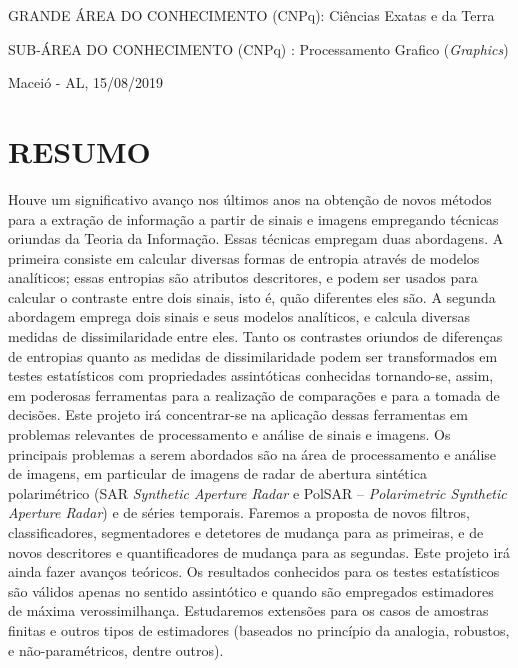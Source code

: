 \documentclass[12pt,letterpaper]{article}
\begin{document}
GRANDE ÁREA DO CONHECIMENTO (CNPq): Ciências  Exatas  e  da  Terra

SUB-ÁREA DO CONHECIMENTO (CNPq) : Processamento Grafico (\textit{Graphics})  

\vspace*{0.8cm}

\begin{center}

Maceió - AL, 15/08/2019

\end{center}

  
  \newpage
\section*{\centering \textbf{RESUMO}} %

Houve um significativo avanço nos últimos anos na obtenção de novos métodos para a extração de informação a partir de sinais e imagens empregando técnicas oriundas da Teoria da Informação. Essas técnicas empregam duas abordagens. A primeira consiste em calcular diversas formas de entropia através de modelos analíticos; essas entropias são atributos descritores, e podem ser usados para calcular o contraste entre dois sinais, isto é, quão diferentes eles são. A segunda abordagem emprega dois sinais e seus modelos analíticos, e calcula diversas medidas de dissimilaridade entre eles. Tanto os contrastes oriundos de diferenças de entropias quanto as medidas de dissimilaridade podem ser transformados em testes estatísticos com propriedades assintóticas conhecidas tornando-se, assim, em poderosas ferramentas para a realização de comparações e para a tomada de decisões. Este projeto irá concentrar-se na aplicação dessas ferramentas em problemas relevantes de processamento e análise de sinais e imagens. Os principais problemas a serem abordados são na área de processamento e análise de imagens, em particular de imagens de radar de abertura sintética polarimétrico (SAR \textit{Synthetic Aperture Radar} e PolSAR -- \textit{Polarimetric Synthetic Aperture Radar}) e de séries temporais. Faremos a proposta de novos filtros, classificadores, segmentadores e detetores de mudança para as primeiras, e de novos descritores e quantificadores de mudança para as segundas. Este projeto irá ainda fazer avanços teóricos. Os resultados conhecidos para os testes estatísticos são válidos apenas no sentido assintótico e quando são empregados estimadores de máxima verossimilhança. Estudaremos extensões para os casos de amostras finitas e outros tipos de estimadores (baseados no princípio da analogia, robustos, e não-paramétricos, dentre outros).
\end{document}
